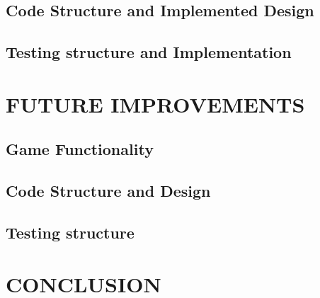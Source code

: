 \documentclass[10pt,twocolumn]{witseiepaper}
\begin{document}
\subsection{Code Structure and Implemented Design}

\subsection{Testing structure and Implementation}

\section{FUTURE IMPROVEMENTS}

\subsection{Game Functionality}

\subsection{Code Structure and Design}\label{code_improvements}

\subsection{Testing structure}

\section{CONCLUSION}

%



\end{document}
